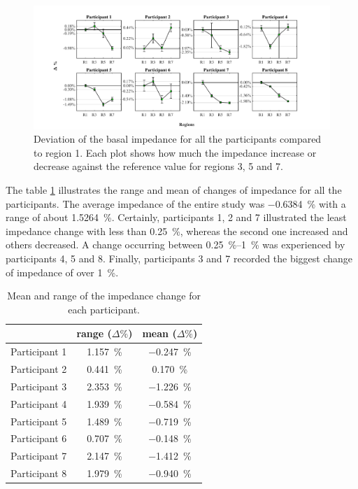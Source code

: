 \begin{figure}[!t]  %
	\includegraphics[width=\textwidth,keepaspectratio, trim={2cm 0cm 3cm 0cm},clip]{figure_b_4}    
	\caption[Percentile change of baseline impedance]{Deviation of the basal impedance for all the participants compared to region 1. Each plot shows how much the impedance increase or decrease against the reference value for regions 3, 5 and 7. }
	\label{fig:delta percent} 
\end{figure}

The table \ref{tbl:change imepdance} illustrates the range and mean of changes of impedance for all the participants. The average impedance of the entire study was \SI{-0.6384}{\percent} with a range of about \SI{1.5264}{\percent}. Certainly, participants 1, 2 and 7 illustrated the least impedance change with less than \SI{0.25}{\percent}, whereas the second one increased and others decreased.  A change occurring between \SIrange{0.25}{1}{\percent} was experienced by participants 4, 5 and 8. Finally, participants 3 and 7 recorded the biggest change of impedance of over \SI{1}{\percent}. 

\begin{table}[!htbp]
	\caption[Range and mean change of impedance of each participant]{Mean and range of the impedance change for each participant.}
	\label{tbl:change imepdance}
	\centering \small
	\begin{tabular}{lcc}
		\toprule
		&\textbf{range ($\Delta \%$)}
		&\textbf{mean ($\Delta \%$)} \\ \midrule
		Participant 1    &     \SI{1.157}{\percent}    &     \SI{-0.247}{\percent}    \\  
		Participant 2    &     \SI{0.441}{\percent}    &     \SI{0.170}{\percent}    \\  
		Participant 3    &     \SI{2.353}{\percent}    &     \SI{-1.226}{\percent}    \\  
		Participant 4    &     \SI{1.939}{\percent}    &     \SI{-0.584}{\percent}    \\  
		Participant 5    &     \SI{1.489}{\percent}    &     \SI{-0.719}{\percent}    \\  
		Participant 6    &     \SI{0.707}{\percent}    &     \SI{-0.148}{\percent}    \\  
		Participant 7    &     \SI{2.147}{\percent}    &     \SI{-1.412}{\percent}    \\  
		Participant 8    &     \SI{1.979}{\percent}    &     \SI{-0.940}{\percent}    \\ 
		\bottomrule 
	\end{tabular}
\end{table}

